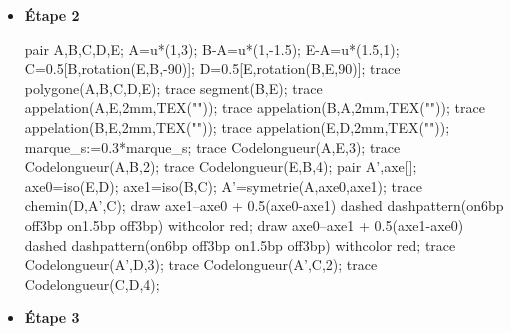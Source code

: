 \begin{methode*1}
\begin{multicols}{3}
\begin{itemize}
\begin{Geometrie}
                    trace Codelongueur(A,B,2);
                    trace Codelongueur(E,B,4);
                \end{Geometrie}
                \columnbreak
                \item \textbf{Étape 2}\\
                \begin{Geometrie}
                    pair A,B,C,D,E;
                    A=u*(1,3);
                    B-A=u*(1,-1.5);
                    E-A=u*(1.5,1);
                    C=0.5[B,rotation(E,B,-90)];
                    D=0.5[E,rotation(B,E,90)];
                    trace polygone(A,B,C,D,E);
                    trace segment(B,E);
                    trace appelation(A,E,2mm,TEX("\tiny{}"));
                    trace appelation(B,A,2mm,TEX("\tiny{}"));
                    trace appelation(B,E,2mm,TEX("\tiny{}"));
                    trace appelation(E,D,2mm,TEX("\tiny{}"));
                    marque_s:=0.3*marque_s;
                    trace Codelongueur(A,E,3);
                    trace Codelongueur(A,B,2);
                    trace Codelongueur(E,B,4);
                    pair A',axe[];
                    axe0=iso(E,D);
                    axe1=iso(B,C);
                    A'=symetrie(A,axe0,axe1);
                    trace chemin(D,A',C);
                    draw axe1--axe0 + 0.5(axe0-axe1) dashed dashpattern(on6bp off3bp on1.5bp off3bp) withcolor red;
                    draw axe0--axe1 + 0.5(axe1-axe0) dashed dashpattern(on6bp off3bp on1.5bp off3bp) withcolor red;
                    trace Codelongueur(A',D,3);
                    trace Codelongueur(A',C,2);
                    trace Codelongueur(C,D,4);
                \end{Geometrie}
                \columnbreak
                \item \textbf{Étape 3}
                

\end{itemize}
\end{multicols}
\end{methode*1}
